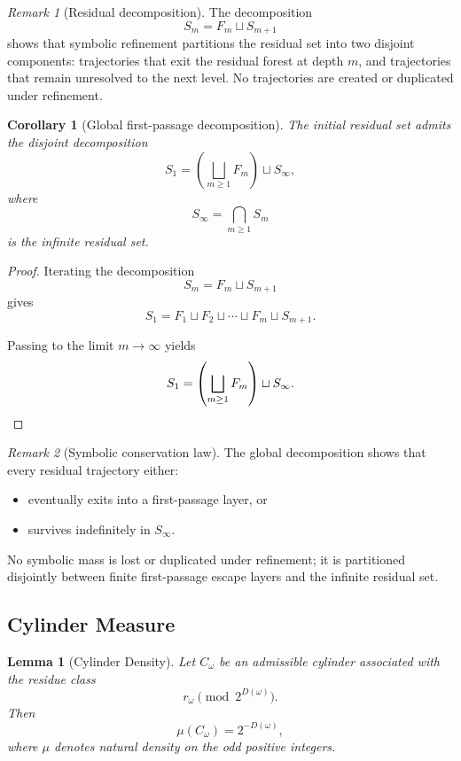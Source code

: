 \documentclass[12pt, oneside]{article}
\numberwithin{equation}{section}
\theoremstyle{definition}
\theoremstyle{plain}
\newtheorem{lemma}[theorem]{Lemma}
\newtheorem{corollary}[theorem]{Corollary}
\theoremstyle{remark}
\newtheorem*{remark}{Remark}
\begin{document}
\begin{remark}[Residual decomposition]
The decomposition
\[
S_m = F_m \sqcup S_{m+1}
\]
shows that symbolic refinement partitions the residual set into two
disjoint components: trajectories that exit the residual forest at
depth \(m\), and trajectories that remain unresolved to the next level.
No trajectories are created or duplicated under refinement.
\end{remark}

\begin{corollary}[Global first-passage decomposition]
\label{cor:global-decomposition}
The initial residual set admits the disjoint decomposition
\[
S_1 = \left(\bigsqcup_{m\ge1} F_m\right) \sqcup S_\infty,
\]
where
\[
S_\infty = \bigcap_{m\ge1} S_m
\]
is the infinite residual set.
\end{corollary}

\begin{proof}
Iterating the decomposition
\[
S_m = F_m \sqcup S_{m+1}
\]
gives
\[
S_1 = F_1 \sqcup F_2 \sqcup \cdots \sqcup F_m \sqcup S_{m+1}.
\]

Passing to the limit \(m\to\infty\) yields
\[
S_1 = \left(\bigsqcup_{m\ge1}F_m\right) \sqcup S_\infty.
\qedhere
\]
\end{proof}

\begin{remark}[Symbolic conservation law]
The global decomposition shows that every residual trajectory
either:
\begin{itemize}
\item eventually exits into a first-passage layer, or
\item survives indefinitely in \(S_\infty\).
\end{itemize}

No symbolic mass is lost or duplicated under refinement; it is
partitioned disjointly between finite first-passage escape layers
and the infinite residual set.
\end{remark}

\subsection{Cylinder Measure}

\begin{lemma}[Cylinder Density]
\label{lem:cylinder-density}
Let \(C_\omega\) be an admissible cylinder associated with the residue
class
\[
r_\omega \pmod{2^{D(\omega)}}.
\]
Then
\[
\mu(C_\omega)=2^{-D(\omega)},
\]
where \(\mu\) denotes natural density on the odd positive integers.
\end{lemma}
\end{document}
